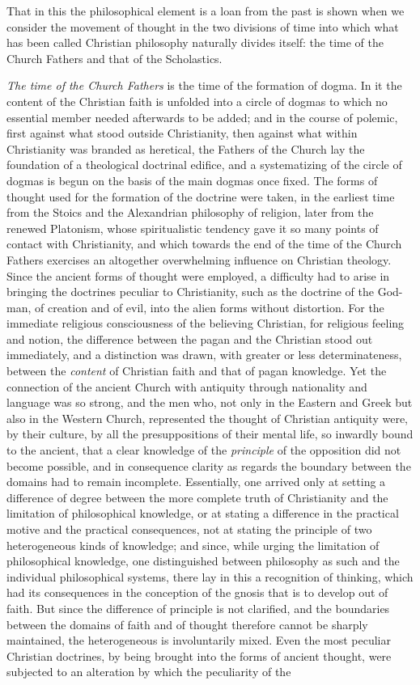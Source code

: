 That in this the philosophical element is a loan from the past is shown when we consider the movement of thought in the two divisions of time into which what has been called Christian philosophy naturally divides itself: the time of the Church Fathers and that of the Scholastics.

\emph{The time of the Church Fathers} is the time of the formation of dogma. In it the content of the Christian faith is unfolded into a circle of dogmas to which no essential member needed afterwards to be added; and in the course of polemic, first against what stood outside Christianity, then against what within Christianity was branded as heretical, the Fathers of the Church lay the foundation of a theological doctrinal edifice, and a systematizing of the circle of dogmas is begun on the basis of the main dogmas once fixed. The forms of thought used for the formation of the doctrine were taken, in the earliest time from the Stoics and the Alexandrian philosophy of religion, later from the renewed Platonism, whose spiritualistic tendency gave it so many points of contact with Christianity, and which towards the end of the time of the Church Fathers exercises an altogether overwhelming influence on Christian theology. Since the ancient forms of thought were employed, a difficulty had to arise in bringing the doctrines peculiar to Christianity, such as the doctrine of the God-man, of creation and of evil, into the alien forms without distortion. For the immediate religious consciousness of the believing Christian, for religious feeling and notion, the difference between the pagan and the Christian stood out immediately, and a distinction was drawn, with greater or less determinateness, between the \emph{content} of Christian faith and that of pagan knowledge. Yet the connection of the ancient Church with antiquity through nationality and language was so strong, and the men who, not only in the Eastern and Greek but also in the Western Church, represented the thought of Christian antiquity were, by their culture, by all the presuppositions of their mental life, so inwardly bound to the ancient, that a clear knowledge of the \emph{principle} of the opposition did not become possible, and in consequence clarity as regards the boundary between the domains had to remain incomplete. Essentially, one arrived only at setting a difference of degree between the more complete truth of Christianity and the limitation of philosophical knowledge, or at stating a difference in the practical motive and the practical consequences, not at stating the principle of two heterogeneous kinds of knowledge; and since, while urging the limitation of philosophical knowledge, one distinguished between philosophy as such and the individual philosophical systems, there lay in this a recognition of thinking, which had its consequences in the conception of the gnosis that is to develop out of faith. But since the difference of principle is not clarified, and the boundaries between the domains of faith and of thought therefore cannot be sharply maintained, the heterogeneous is involuntarily mixed. Even the most peculiar Christian doctrines, by being brought into the forms of ancient thought, were subjected to an alteration by which the peculiarity of the 